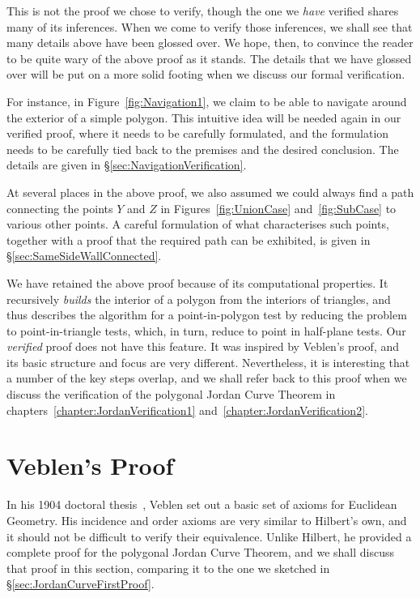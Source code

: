 This is not the proof we chose to verify, though the one we \emph{have} verified shares many of its inferences. When we come to verify those inferences, we shall see that many details above have been glossed over. We hope, then, to convince the reader to be quite wary of the above proof as it stands. The details that we have glossed over will be put on a more solid footing when we discuss our formal verification.

\label{sec:Jordan1NavigationDiscussion}For instance, in Figure~\ref{fig:Navigation1}, we claim to be able to navigate around the exterior of a simple polygon. This intuitive idea will be needed again in our verified proof, where it needs to be carefully formulated, and the formulation needs to be carefully tied back to the premises and the desired conclusion. The details are given in \S\ref{sec:NavigationVerification}.

\label{sec:Jordan1SameSideDiscussion}At several places in the above proof, we also assumed we could always find a path connecting the points $Y$ and $Z$ in Figures~\ref{fig:UnionCase} and~\ref{fig:SubCase} to various other points. A careful formulation of what characterises such points, together with a proof that the required path can be exhibited, is given in \S\ref{sec:SameSideWallConnected}.

We have retained the above proof because of its computational properties. It recursively \emph{builds} the interior of a polygon from the interiors of triangles, and thus describes the algorithm for a point-in-polygon test by reducing the problem to point-in-triangle tests, which, in turn, reduce to point in half-plane tests. Our \emph{verified} proof does not have this feature. It was inspired by Veblen's proof, and its basic structure and focus are very different. Nevertheless, it is interesting that a number of the key steps overlap, and we shall refer back to this proof when we discuss the verification of the polygonal Jordan Curve Theorem in chapters~\ref{chapter:JordanVerification1} and~\ref{chapter:JordanVerification2}.

\section{Veblen's Proof}\label{sec:VeblenProof}
In his 1904 doctoral thesis~\cite{Veblenphd}, Veblen set out a basic set of axioms for Euclidean Geometry. His incidence and order axioms are very similar to Hilbert's own, and it should not be difficult to verify their equivalence. Unlike Hilbert, he provided a complete proof for the polygonal Jordan Curve Theorem, and we shall discuss that proof in this section, comparing it to the one we sketched in \S\ref{sec:JordanCurveFirstProof}.

